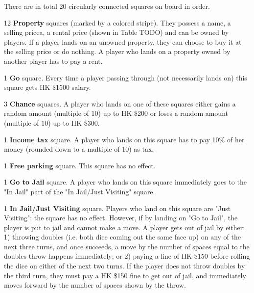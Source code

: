       \begin{enumerate}[label=\texttt{[BOARD-SPECS-\arabic*]}:, leftmargin=10em]
        \item There are in total 20 circularly connected squares on board in order.
        \item 12 \textbf{Property} squares (marked by a colored stripe). They possess a name, a selling pricea, a rental price (shown in Table TODO) and can be owned by players. If a player lands on an unowned property, they can choose to buy it at the selling price or do nothing. A player who lands on a property owned by another player has to pay a rent.
        \item 1 \textbf{Go} square. Every time a player passing through (not necessarily lands on) this square gets HK \$1500 salary.
        \item 3 \textbf{Chance} squares. A player who lands on one of these squares either gains a random amount (multiple of 10) up to HK \$200 or loses a random amount (multiple of 10) up to HK \$300.
        \item 1 \textbf{Income tax} square. A player who lands on this square has to pay 10\% of her money (rounded down to a multiple of 10) as tax.
        \item 1 \textbf{Free parking} square. This square has no effect.
        \item 1 \textbf{Go to Jail} square. A player who lands on this square immediately goes to the "In Jail" part of the "In Jail/Just Visiting" square.
        \item 1 \textbf{In Jail/Just Visiting} square. Players who land on this square are "Just Visiting": the square has no effect. However, if by landing on "Go to Jail", the player is put to jail and cannot make a move. A player gets out of jail by either: 1) throwing doubles (i.e. both dice coming out the same face up) on any of the next three turns, and once succeeds, a move by the number of spaces equal to the doubles throw happens immediately; or 2) paying a fine of HK \$150 before rolling the dice on either of the next two turns. If the player does not throw doubles by the third turn, they must pay a HK \$150 fine to get out of jail, and immediately moves forward by the number of spaces shown by the throw. 
      \end{enumerate}

